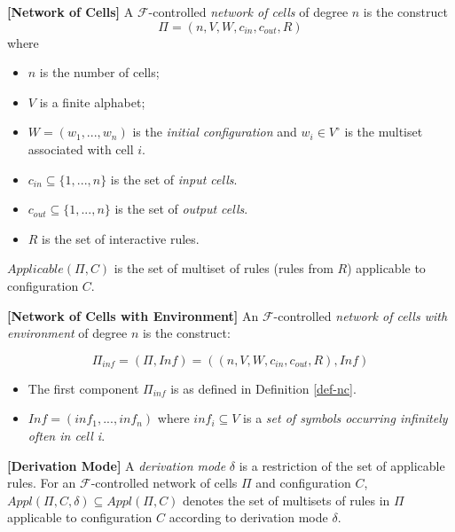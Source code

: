 \documentclass[a4paper]{article}
\theoremstyle{definition}
\begin{document}
\label{def-nc} \textbf{[Network of Cells]} A $\mathscr{F}$-controlled \emph{network of 
cells} of degree $n$ is the construct $$\Pi = (n, V, W, c_{in}, c_{out}, R)$$ where

\begin{multicols}{2}
\begin{itemize}
\item $n$ is the number of cells; 
\item $V$ is a finite alphabet;
\item $W = (w_1,...,w_n)$ is the \emph{initial configuration} and $w_i \in V^{\circ}$ is the
      multiset associated with cell $i$.
\item $c_{in} \subseteq \{1,...,n\}$ is the set of \emph{input cells}.
\item $c_{out} \subseteq \{1,...,n\}$ is the set of \emph{output cells}.
\item $R$ is the set of interactive rules. 
\end{itemize}
\end{multicols}

$Applicable(\Pi,C)$ is the set of  multiset of rules (rules from $R$) applicable to configuration 
$C$.


\label{[def-nc2]}\textbf{[Network of Cells with Environment]} An 
$\mathscr{F}$-controlled \emph{network of cells with environment} of degree $n$ is the construct:

$$\Pi_{inf} = (\Pi,Inf) = ((n,V,W,c_{in},c_{out},R), Inf)$$

\begin{multicols}{2}
\begin{itemize}
\item The first component $\Pi_{inf}$ is as defined in Definition \ref{def-nc}.
\item $Inf = (inf_1,...,inf_n)$ where $inf_i \subseteq V$ is a \emph{set of symbols occurring 
infinitely often in cell i}.
\end{itemize}
\end{multicols}


\label{def-derv} \textbf{[Derivation Mode]} A \emph{derivation mode} $\delta$ is a
restriction of the set of applicable rules. For an $\mathscr{F}$-controlled network of cells $\Pi$
and configuration $C$, $Appl(\Pi, C, \delta) \subseteq Appl(\Pi, C)$ denotes the set of multisets of
rules in $\Pi$ applicable to configuration $C$ according to derivation mode $\delta$.
\end{document}
